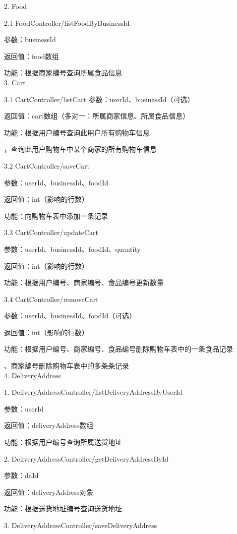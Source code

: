 2. Food

2.1 FoodController/listFoodByBusinessId 

参数：businessId 

返回值：food数组

功能：根据商家编号查询所属食品信息~\\

3. Cart

3.1 CartController/listCart 
参数：userId、businessId（可选）

返回值：cart数组（多对一：所属商家信息、所属食品信息）

功能：根据用户编号查询此用户所有购物车信息

\qquad{}，查询此用户购物车中某个商家的所有购物车信息

3.2 CartController/saveCart 

参数：userId、businessId、foodId 

返回值：int（影响的行数）

功能：向购物车表中添加一条记录

3.3 CartController/updateCart 

参数：userId、businessId、foodId、quantity

返回值：int（影响的行数）

功能：根据用户编号、商家编号、食品编号更新数量

3.4 CartController/removeCart 

参数：userId、businessId、foodId（可选）

返回值：int（影响的行数）

功能：根据用户编号、商家编号、食品编号删除购物车表中的一条食品记录

\qquad{}、商家编号删除购物车表中的多条条记录~\\

4. DeliveryAddress

1. DeliveryAddressController/listDeliveryAddressByUserId 

参数：userId 

返回值：deliveryAddress数组

功能：根据用户编号查询所属送货地址

2. DeliveryAddressController/getDeliveryAddressById 

参数：daId 

返回值：deliveryAddress对象

功能：根据送货地址编号查询送货地址

3. DeliveryAddressController/saveDeliveryAddress 

